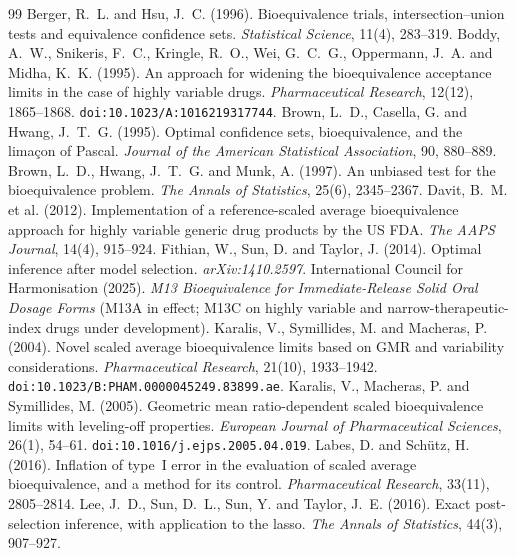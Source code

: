 \documentclass[11pt]{article}
\theoremstyle{remark}
\begin{document}

\begin{thebibliography}{99}
 Berger, R.~L. and Hsu, J.~C. (1996). Bioequivalence trials, intersection--union tests and equivalence confidence sets. \emph{Statistical Science}, 11(4), 283--319.
 Boddy, A.~W., Snikeris, F.~C., Kringle, R.~O., Wei, G.~C.~G., Oppermann, J.~A. and Midha, K.~K. (1995). An approach for widening the bioequivalence acceptance limits in the case of highly variable drugs. \emph{Pharmaceutical Research}, 12(12), 1865--1868. \texttt{doi:10.1023/A:1016219317744}.
 Brown, L.~D., Casella, G. and Hwang, J.~T.~G. (1995). Optimal confidence sets, bioequivalence, and the lima\c{c}on of Pascal. \emph{Journal of the American Statistical Association}, 90, 880--889.
 Brown, L.~D., Hwang, J.~T.~G. and Munk, A. (1997). An unbiased test for the bioequivalence problem. \emph{The Annals of Statistics}, 25(6), 2345--2367.
 Davit, B.~M. et al. (2012). Implementation of a reference-scaled average bioequivalence approach for highly variable generic drug products by the US FDA. \emph{The AAPS Journal}, 14(4), 915--924.
 Fithian, W., Sun, D. and Taylor, J. (2014). Optimal inference after model selection. \emph{arXiv:1410.2597}.
 International Council for Harmonisation (2025). \emph{M13 Bioequivalence for Immediate-Release Solid Oral Dosage Forms} (M13A in effect; M13C on highly variable and narrow-therapeutic-index drugs under development).
 Karalis, V., Symillides, M. and Macheras, P. (2004). Novel scaled average bioequivalence limits based on GMR and variability considerations. \emph{Pharmaceutical Research}, 21(10), 1933--1942. \texttt{doi:10.1023/B:PHAM.0000045249.83899.ae}.
 Karalis, V., Macheras, P. and Symillides, M. (2005). Geometric mean ratio-dependent scaled bioequivalence limits with leveling-off properties. \emph{European Journal of Pharmaceutical Sciences}, 26(1), 54--61. \texttt{doi:10.1016/j.ejps.2005.04.019}.
 Labes, D. and Sch\"utz, H. (2016). Inflation of type~I error in the evaluation of scaled average bioequivalence, and a method for its control. \emph{Pharmaceutical Research}, 33(11), 2805--2814.
 Lee, J.~D., Sun, D.~L., Sun, Y. and Taylor, J.~E. (2016). Exact post-selection inference, with application to the lasso. \emph{The Annals of Statistics}, 44(3), 907--927.

\end{thebibliography}
\end{document}
